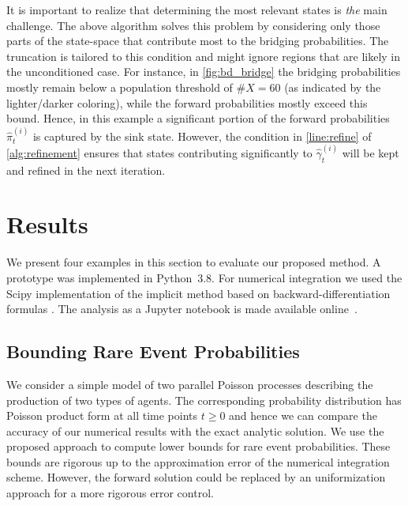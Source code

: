 It is important to realize that determining the most relevant states is \emph{the} main challenge.
The above algorithm solves this problem by considering only those parts of the state-space that contribute most to the bridging probabilities.
The truncation is tailored to this condition and might ignore regions that are likely in the unconditioned case.
For instance, in \autoref{fig:bd_bridge} the bridging probabilities mostly remain below a population threshold of $\#X=60$ (as indicated by the lighter/darker coloring), while the forward probabilities mostly exceed this bound. Hence, in this example a significant portion of the forward probabilities $\hat\pi_t^{(i)}$  
 is captured by the sink state. However, the condition in \autoref{line:refine} of \autoref{alg:refinement} ensures that
states contributing significantly to $\hat\gamma_t^{(i)}$ will be kept and refined in the next iteration.
 


\section{Results}\label{sec:bridging:results}
% 
We present four examples in this section to evaluate our proposed method. 
A prototype was implemented in Python~3.8. For numerical integration we used the Scipy implementation \cite{2020SciPy-NMeth} of the implicit method based on backward-differentiation formulas \cite{byrne1975polyalgorithm}.
The analysis as a Jupyter notebook is made available online~\cite{mjp_bridging}.

\subsection{Bounding Rare Event Probabilities}
We consider a simple model of two parallel Poisson processes describing the production of two 
types of agents. 
The corresponding probability distribution
has Poisson product form at all time points $t\geq 0$ and hence we can compare the accuracy of our  numerical results with the exact analytic solution.
We use the proposed approach to compute lower bounds for rare event probabilities.
These bounds are rigorous up to the approximation error of the numerical integration scheme.
However, the forward solution could be replaced by an uniformization approach for a more rigorous error control.





